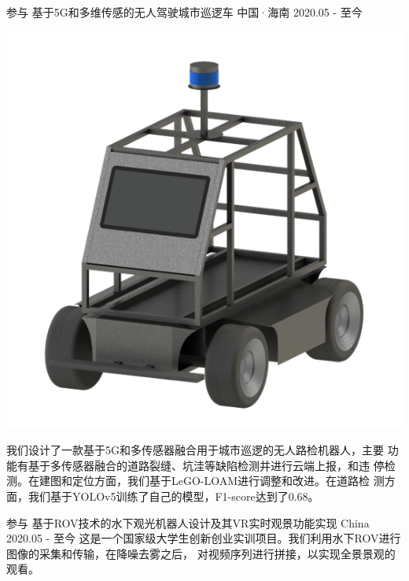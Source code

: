 \begin{cventries}
\cventry
{参与} %
{基于5G和多维传感的无人驾驶城市巡逻车} %
{中国·海南} %
{2020.05 - 至今} %
{
    \begin{minipage}[b]{0.25\linewidth}
        \includegraphics[height=8\baselineskip]{figure/car.png}
    \end{minipage}
    \hfill
    \begin{minipage}[b]{0.7\linewidth}
        我们设计了一款基于5G和多传感器融合用于城市巡逻的无人路检机器人，主要
        功能有基于多传感器融合的道路裂缝、坑洼等缺陷检测并进行云端上报，和违
        停检测。在建图和定位方面，我们基于LeGO-LOAM进行调整和改进。在道路检
        测方面，我们基于YOLOv5训练了自己的模型，F1-score达到了0.68。
    \end{minipage}
}

\cventry
{参与} %
{基于ROV技术的水下观光机器人设计及其VR实时观景功能实现} %
{China} %
{2020.05 - 至今} %
{
    这是一个国家级大学生创新创业实训项目。我们利用水下ROV进行图像的采集和传输，在降噪去雾之后，
    对视频序列进行拼接，以实现全景景观的观看。
}



\end{cventries}
